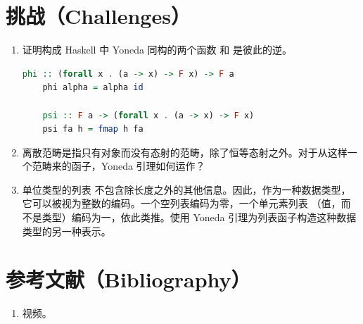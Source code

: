 \section{挑战（Challenges）}

\begin{enumerate}
  \tightlist
  \item
  证明构成 Haskell 中 Yoneda 同构的两个函数  和  是彼此的逆。

  \begin{lstlisting}[language=Haskell]
    phi :: (forall x . (a -> x) -> F x) -> F a
    phi alpha = alpha id

    psi :: F a -> (forall x . (a -> x) -> F x)
    psi fa h = fmap h fa
  \end{lstlisting}
  \item
  离散范畴是指只有对象而没有态射的范畴，除了恒等态射之外。对于从这样一个范畴来的函子，Yoneda 引理如何运作？
  \item
  单位类型的列表 \code{{[}(){]}} 不包含除长度之外的其他信息。因此，作为一种数据类型，它可以被视为整数的编码。一个空列表编码为零，一个单元素列表 \code{{[}(){]}}（值，而不是类型）编码为一，依此类推。使用 Yoneda 引理为列表函子构造这种数据类型的另一种表示。
\end{enumerate}

\section{参考文献（Bibliography）}

\begin{enumerate}
  \tightlist
  \item
   视频。
\end{enumerate}
